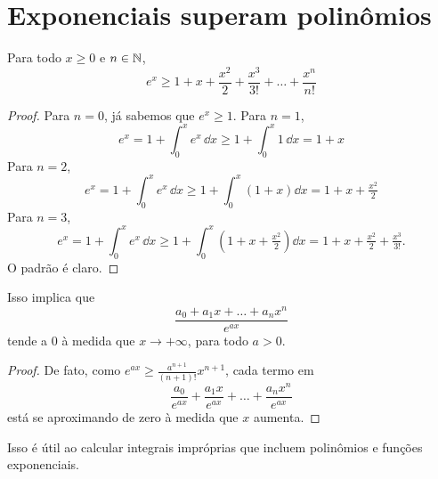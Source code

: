 \clearpage
\section{Exponenciais superam polinômios}

Para todo $ x \geq 0 $ e $ n \in \mathbb{N} $,
\[
e^x
\geq
1 + x + \frac{x^2}{2} + \frac{x^3}{3!} + \dots + \frac{x^n}{n!}
\]
\begin{proof}
Para $ n=0 $, já sabemos que $ e^x \geq 1 $.
Para $ n=1 $,
\[
e^x
=
1 + \int_0^x e^x \, \dd x
\geq
1 + \int_0^x 1 \, \dd x
=
1+x
\]
Para $ n=2 $,
\[
e^x
=
1 + \int_0^x e^x \, \dd x
\geq
1 + \int_0^x (1+x) \dd x
=
1+x+\tfrac{x^2}{2}
\]
Para $ n=3 $,
\[
e^x
=
1 + \int_0^x e^x \, \dd x
\geq
1 + \int_0^x (1+x+\tfrac{x^2}{2}) \dd x
=
1+x+\tfrac{x^2}{2}+\tfrac{x^3}{3!}
.
\]
O padrão é claro.
\end{proof}

Isso implica que
\[
\frac{a_0 + a_1 x + \dots + a_n x^n}{e^{ax}}
\]
tende a $ 0 $ à medida que $ x \to +\infty $, para todo $ a>0 $.

\begin{proof}
De fato, como $ e^{ax} \geq \frac{a^{n+1}}{(n+1)!} x^{n+1} $, cada termo em
\[
\frac{a_0}{e^{ax}}
+
\frac{a_1 x}{e^{ax}}
+ \dots +
\frac{a_n x^n}{e^{ax}}
\]
está se aproximando de zero à medida que $ x $ aumenta.
\end{proof}

Isso é útil ao calcular integrais impróprias que incluem polinômios e funções exponenciais.


